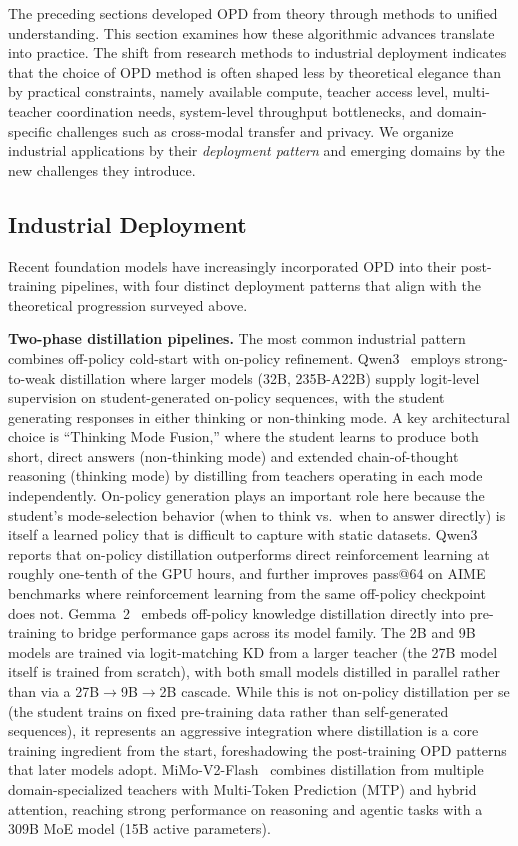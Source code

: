 \documentclass{article} %
\begin{document}
The preceding sections developed OPD from theory through methods to unified understanding. This section examines how these algorithmic advances translate into practice. The shift from research methods to industrial deployment indicates that the choice of OPD method is often shaped less by theoretical elegance than by practical constraints, namely available compute, teacher access level, multi-teacher coordination needs, system-level throughput bottlenecks, and domain-specific challenges such as cross-modal transfer and privacy. We organize industrial applications by their \emph{deployment pattern} and emerging domains by the new challenges they introduce.

\subsection{Industrial Deployment}
\label{subsec:industrial}

Recent foundation models have increasingly incorporated OPD into their post-training pipelines, with four distinct deployment patterns that align with the theoretical progression surveyed above.

\textbf{Two-phase distillation pipelines.} The most common industrial pattern combines off-policy cold-start with on-policy refinement. Qwen3~\citep{2505.09388} employs strong-to-weak distillation where larger models (32B, 235B-A22B) supply logit-level supervision on student-generated on-policy sequences, with the student generating responses in either thinking or non-thinking mode. A key architectural choice is ``Thinking Mode Fusion,'' where the student learns to produce both short, direct answers (non-thinking mode) and extended chain-of-thought reasoning (thinking mode) by distilling from teachers operating in each mode independently. On-policy generation plays an important role here because the student's mode-selection behavior (when to think vs.\ when to answer directly) is itself a learned policy that is difficult to capture with static datasets. Qwen3 reports that on-policy distillation outperforms direct reinforcement learning at roughly one-tenth of the GPU hours, and further improves pass@64 on AIME benchmarks where reinforcement learning from the same off-policy checkpoint does not. Gemma~2~\citep{2408.00118} embeds off-policy knowledge distillation directly into pre-training to bridge performance gaps across its model family. The 2B and 9B models are trained via logit-matching KD from a larger teacher (the 27B model itself is trained from scratch), with both small models distilled in parallel rather than via a 27B$\to$9B$\to$2B cascade. While this is not on-policy distillation per se (the student trains on fixed pre-training data rather than self-generated sequences), it represents an aggressive integration where distillation is a core training ingredient from the start, foreshadowing the post-training OPD patterns that later models adopt. MiMo-V2-Flash~\citep{2601.02780} combines distillation from multiple domain-specialized teachers with Multi-Token Prediction (MTP) and hybrid attention, reaching strong performance on reasoning and agentic tasks with a 309B MoE model (15B active parameters).
\end{document}
